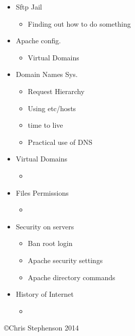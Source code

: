 \documentclass[12pt, a4paper]{article}
\begin{document}
\begin{itemize}
\begin{itemize}
 \end{itemize}

 \item Sftp Jail
 \begin{itemize}
  \item Finding out how to do something
 \end{itemize}

 \item Apache config.
 \begin{itemize}
  \item Virtual Domains
 \end{itemize}

 \item Domain Names Sys.
 \begin{itemize}
  \item Request Hierarchy
  \item Using etc/hosts
  \item time to live
  \item Practical use of DNS
 \end{itemize}

 \item Virtual Domains
 \begin{itemize}
  \item 
 \end{itemize}

 \item Files Permissions
 \begin{itemize}
  \item 
 \end{itemize}

 \item Security on servers
 \begin{itemize}
  \item Ban root login
  \item Apache security settings
  \item Apache directory commands
 \end{itemize}

 \item History of Internet
 \begin{itemize}
  \item 
 \end{itemize}

\end{itemize}


\copyright Chris Stephenson 2014
\end{document}
